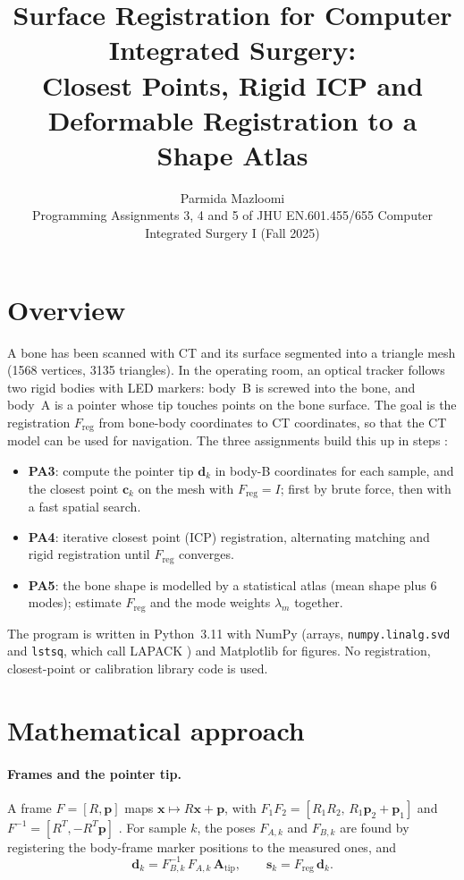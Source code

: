 \documentclass[10pt]{article}
\title{Surface Registration for Computer Integrated Surgery:\\Closest Points, Rigid ICP and Deformable Registration to a Shape Atlas}
\author{Parmida Mazloomi\\\small Programming Assignments 3, 4 and 5 of JHU EN.601.455/655 Computer Integrated Surgery I (Fall 2025)}
\date{}
\newcommand{\vect}[1]{\mathbf{#1}}
\newcommand{\F}{F_{\mathrm{reg}}}
\begin{document}
\maketitle
\vspace{-1.5em}

\section{Overview}

A bone has been scanned with CT and its surface segmented into a triangle mesh (1568 vertices, 3135 triangles). In the operating room, an optical tracker follows two rigid bodies with LED markers: body~B is screwed into the bone, and body~A is a pointer whose tip touches points on the bone surface. The goal is the registration $\F$ from bone-body coordinates to CT coordinates, so that the CT model can be used for navigation. The three assignments build this up in steps \cite{handout34,handout5}:
\begin{itemize}
\item \textbf{PA3}: compute the pointer tip $\vect d_k$ in body-B coordinates for each sample, and the closest point $\vect c_k$ on the mesh with $\F=I$; first by brute force, then with a fast spatial search.
\item \textbf{PA4}: iterative closest point (ICP) registration, alternating matching and rigid registration until $\F$ converges.
\item \textbf{PA5}: the bone shape is modelled by a statistical atlas (mean shape plus 6 modes); estimate $\F$ and the mode weights $\lambda_m$ together.
\end{itemize}
The program is written in Python~3.11 with NumPy \cite{numpy} (arrays, \texttt{numpy.linalg.svd} and \texttt{lstsq}, which call LAPACK \cite{lapack}) and Matplotlib \cite{matplotlib} for figures. No registration, closest-point or calibration library code is used.

\section{Mathematical approach}

\paragraph{Frames and the pointer tip.} A frame $F=[R,\vect p]$ maps $\vect x \mapsto R\vect x+\vect p$, with $F_1F_2=[R_1R_2,\,R_1\vect p_2+\vect p_1]$ and $F^{-1}=[R^T,-R^T\vect p]$ \cite{lecframes}. For sample $k$, the poses $F_{A,k}$ and $F_{B,k}$ are found by registering the body-frame marker positions to the measured ones, and \cite{handout34}
\begin{equation}
\vect d_k = F_{B,k}^{-1}\,F_{A,k}\,\vect A_{\mathrm{tip}}, \qquad \vect s_k=\F\,\vect d_k .
\end{equation}
\end{document}
